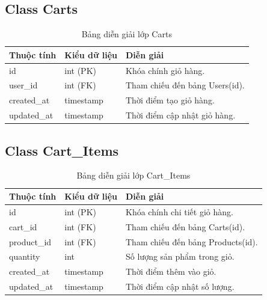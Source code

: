 \subsection{Class Carts}

\begin{table}[H]
\centering
\caption{Bảng diễn giải lớp Carts}
\label{tab:carts}
\begin{tabular}{|l|l|p{7cm}|}
\hline
\textbf{Thuộc tính} & \textbf{Kiểu dữ liệu} & \textbf{Diễn giải} \\ \hline
id & int (PK) & Khóa chính giỏ hàng. \\ \hline
user\_id & int (FK) & Tham chiếu đến bảng Users(id). \\ \hline
created\_at & timestamp & Thời điểm tạo giỏ hàng. \\ \hline
updated\_at & timestamp & Thời điểm cập nhật giỏ hàng. \\ \hline
\end{tabular}
\end{table}

\subsection{Class Cart\_Items}

\begin{table}[H]
\centering
\caption{Bảng diễn giải lớp Cart\_Items}
\label{tab:cart_items}
\begin{tabular}{|l|l|p{7cm}|}
\hline
\textbf{Thuộc tính} & \textbf{Kiểu dữ liệu} & \textbf{Diễn giải} \\ \hline
id & int (PK) & Khóa chính chi tiết giỏ hàng. \\ \hline
cart\_id & int (FK) & Tham chiếu đến bảng Carts(id). \\ \hline
product\_id & int (FK) & Tham chiếu đến bảng Products(id). \\ \hline
quantity & int & Số lượng sản phẩm trong giỏ. \\ \hline
created\_at & timestamp & Thời điểm thêm vào giỏ. \\ \hline
updated\_at & timestamp & Thời điểm cập nhật số lượng. \\ \hline
\end{tabular}
\end{table}

